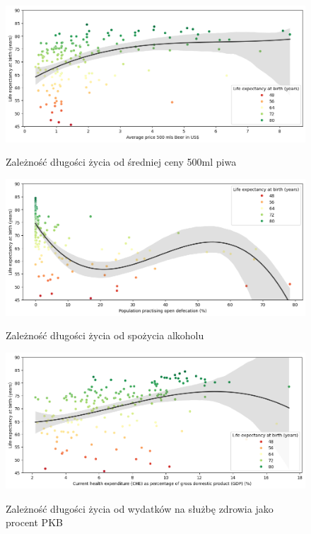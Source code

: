 \documentclass{article}
\begin{document}
\begin{enumerate}
    \begin{figure}[H]
        \begin{minipage}[t]{0.48\textwidth}
            \label{fig:beer}
            \includegraphics[width=\textwidth]{graphs/beer.png}
            \caption{Zależność długości życia od średniej ceny 500ml piwa}
            \centering
        \end{minipage}
        \hfill
        \begin{minipage}[t]{0.48\textwidth}
            \label{fig:toilets}
            \includegraphics[width=\textwidth]{graphs/open_defecation.png}
            \caption{Zależność długości życia od spożycia alkoholu}
            \centering
        \end{minipage}
    \end{figure}

    \begin{figure}[H]
        \begin{minipage}[t]{0.48\textwidth}
            \label{fig:che}
            \includegraphics[width=\textwidth]{graphs/che.png}
            \caption{Zależność długości życia od wydatków na służbę zdrowia jako procent PKB}
            \centering
        \end{minipage}
    \end{figure}
\end{enumerate}
\end{document}
